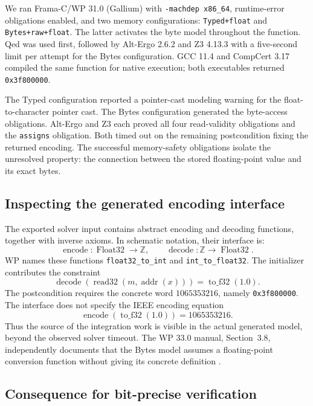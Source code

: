 \documentclass[manuscript, screen, review]{acmart}
\begin{document}
We ran Frama-C/WP 31.0 (Gallium) with \texttt{-machdep x86\_64},
runtime-error obligations enabled, and two memory configurations:
\texttt{Typed+float} and \texttt{Bytes+raw+float}. The latter activates
the byte model throughout the function. Qed was used first, followed by
Alt-Ergo 2.6.2 and Z3 4.13.3 with a five-second limit per attempt for the
Bytes configuration. GCC 11.4 and CompCert 3.17 compiled the same function
for native execution; both executables returned \texttt{0x3f800000}.

The Typed configuration reported a pointer-cast modeling
warning for the float-to-character pointer cast. The Bytes configuration
generated the byte-access obligations. Alt-Ergo and Z3 each proved all
four read-validity obligations and the \texttt{assigns} obligation. Both
timed out on the remaining postcondition fixing the returned encoding.
The successful memory-safety obligations isolate the unresolved property:
the connection between the stored floating-point value and its exact bytes.

\subsection{Inspecting the generated encoding interface}

The exported solver input contains abstract encoding and decoding
functions, together with inverse axioms. In schematic notation, their
interface is:
\[
 \operatorname{encode}:\operatorname{Float32}\to\mathbb{Z},\qquad
 \operatorname{decode}:\mathbb{Z}\to\operatorname{Float32}.
\]
WP names these functions \texttt{float32\_to\_int} and
\texttt{int\_to\_float32}. The initializer contributes the constraint
\[
 \operatorname{decode}(\operatorname{read32}(m,\operatorname{addr}(x)))
   = \operatorname{to\_f32}(1.0).
\]
The postcondition requires the concrete word $1065353216$, namely
\texttt{0x3f800000}. The interface does not specify the IEEE encoding
equation
\[
 \operatorname{encode}(\operatorname{to\_f32}(1.0))=1065353216.
\]
Thus the source of the integration work is visible in the actual generated
model, beyond the observed solver timeout. The WP 33.0 manual, Section~3.8,
independently documents that the Bytes model assumes a floating-point
conversion function without giving its concrete definition
\cite{FramaCWPManual}.

\subsection{Consequence for bit-precise verification}
\end{document}
